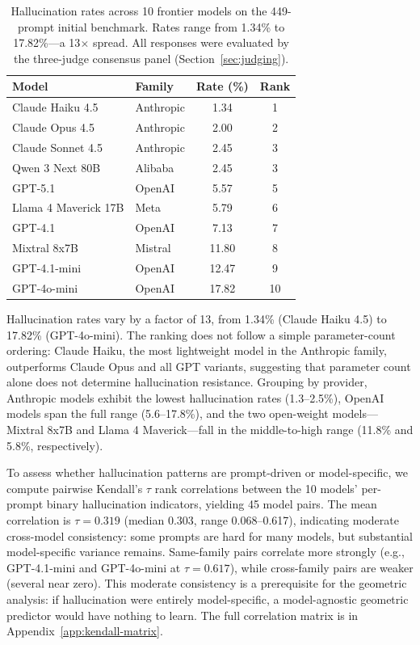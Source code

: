 \begin{table}[ht]
\centering
\small
\begin{tabular}{llcc}
\toprule
\textbf{Model} & \textbf{Family} & \textbf{Rate (\%)} & \textbf{Rank} \\
\midrule
Claude Haiku 4.5 & Anthropic & 1.34 & 1 \\
Claude Opus 4.5 & Anthropic & 2.00 & 2 \\
Claude Sonnet 4.5 & Anthropic & 2.45 & 3 \\
Qwen 3 Next 80B & Alibaba & 2.45 & 3 \\
GPT-5.1 & OpenAI & 5.57 & 5 \\
Llama 4 Maverick 17B & Meta & 5.79 & 6 \\
GPT-4.1 & OpenAI & 7.13 & 7 \\
Mixtral 8x7B & Mistral & 11.80 & 8 \\
GPT-4.1-mini & OpenAI & 12.47 & 9 \\
GPT-4o-mini & OpenAI & 17.82 & 10 \\
\bottomrule
\end{tabular}
\caption{Hallucination rates across 10 frontier models on the 449-prompt initial benchmark. Rates range from 1.34\% to 17.82\%---a 13$\times$ spread. All responses were evaluated by the three-judge consensus panel (Section~\ref{sec:judging}).}
\label{tab:10-model-rates}
\end{table}

Hallucination rates vary by a factor of 13, from 1.34\% (Claude Haiku 4.5) to 17.82\% (GPT-4o-mini). The ranking does not follow a simple parameter-count ordering: Claude Haiku, the most lightweight model in the Anthropic family, outperforms Claude Opus and all GPT variants, suggesting that parameter count alone does not determine hallucination resistance. Grouping by provider, Anthropic models exhibit the lowest hallucination rates (1.3--2.5\%), OpenAI models span the full range (5.6--17.8\%), and the two open-weight models---Mixtral 8x7B and Llama 4 Maverick---fall in the middle-to-high range (11.8\% and 5.8\%, respectively). 

To assess whether hallucination patterns are prompt-driven or model-specific, we compute pairwise Kendall's $\tau$ rank correlations between the 10 models' per-prompt binary hallucination indicators, yielding 45 model pairs. The mean correlation is $\tau = 0.319$ (median 0.303, range 0.068--0.617), indicating moderate cross-model consistency: some prompts are hard for many models, but substantial model-specific variance remains. Same-family pairs correlate more strongly (e.g., GPT-4.1-mini and GPT-4o-mini at $\tau = 0.617$), while cross-family pairs are weaker (several near zero). This moderate consistency is a prerequisite for the geometric analysis: if hallucination were entirely model-specific, a model-agnostic geometric predictor would have nothing to learn. The full correlation matrix is in Appendix~\ref{app:kendall-matrix}.

